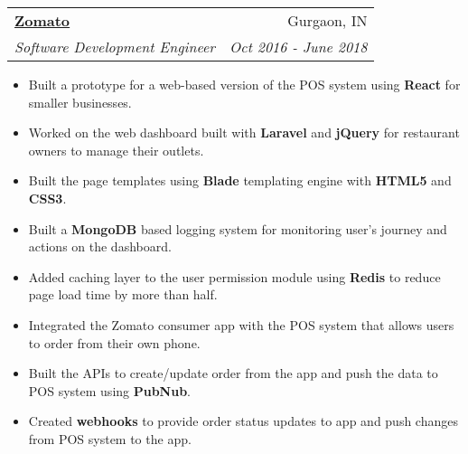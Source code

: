 \documentclass[letterpaper,11pt]{article}
\makeatletter
\newcommand{\resumeItemNoBold}[1]{
  \item\small{
    {#1 \vspace{-2pt}}
  }
}
\newcommand{\resumeSubheading}[4]{
  \vspace{-1pt}\item
    \begin{tabular*}{0.97\textwidth}{l@{\extracolsep{\fill}}r}
      \textbf{#1} & #2 \\
      \textit{\small#3} & \textit{\small #4} \\
    \end{tabular*}\vspace{-5pt}
}
\newcommand{\resumeItemListStart}{\begin{itemize}}
\newcommand{\resumeItemListEnd}{\end{itemize}\vspace{-5pt}}
\newcommand{\resumeItemListHeading}[1]{\textbf{#1}\vspace{-5pt}}
\makeatother
\begin{document}
    \resumeSubheading
      {\href{https://www.zomato.com}{\underline{Zomato}}}{Gurgaon, IN}
      {Software Development Engineer}{Oct 2016 - June 2018}
      
      \resumeItemListStart
          \resumeItemNoBold
          {Built a prototype for a web-based version of the POS system using \textbf{React} for smaller businesses.}
          \resumeItemNoBold
          {Worked on the web dashboard built with \textbf{Laravel} and \textbf{jQuery} for restaurant owners to manage their outlets.}
          \resumeItemNoBold
          {Built the page templates using \textbf{Blade} templating engine with \textbf{HTML5} and \textbf{CSS3}.}
           \resumeItemNoBold
          {Built a \textbf{MongoDB} based logging system for monitoring user's journey and actions on the dashboard.}
          \resumeItemNoBold
          {Added caching layer to the user permission module using \textbf{Redis} to reduce page load time by more than half.}
      
          \resumeItemNoBold
          {Integrated the Zomato consumer app with the POS system that allows users to order from their own phone.}
          \resumeItemNoBold
          {Built the APIs to create/update order from the app and push the data to POS system using \textbf{PubNub}.}
          \resumeItemNoBold
          {Created \textbf{webhooks} to provide order status updates to app and push changes from POS system to the app.}
      \resumeItemListEnd
      
      
\end{document}
